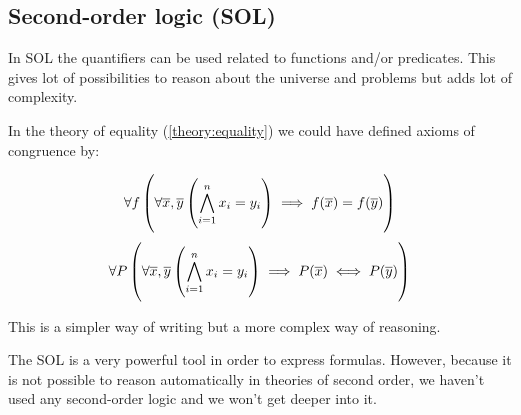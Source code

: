 \subsection{Second-order logic (SOL)}

In \gls{SOL} the quantifiers can be used related to functions and/or predicates. This gives lot of possibilities to reason about the universe and problems but adds lot of complexity. 

In the theory of equality (\ref{theory:equality}) we could have defined axioms of congruence by:

\[\forall f \left( \forall \overline{x},\overline{y} \left( \bigwedge_{i=1}^n x_i = y_i \right) \implies f(\overline{x}) = f(\overline{y}) \right)\]
\[\forall P \left( \forall \overline{x},\overline{y} \left( \bigwedge_{i=1}^n x_i = y_i \right) \implies P(\overline{x}) \iff P(\overline{y}) \right)\]

This is a simpler way of writing but a more complex way of reasoning.

The \gls{SOL} is a very powerful tool in order to express formulas. 
%
However, because it is not possible to reason automatically in theories of second order, we haven't used any second-order logic and we won't get deeper into it. 

